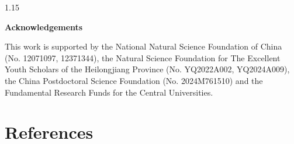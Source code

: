 \documentclass[preprint,12pt]{elsarticle1}
\numberwithin{equation}{section}
\begin{document}
\begin{spacing}{1.15}
\vspace{3mm}

\noindent
\textbf{Acknowledgements}
\vspace{3mm}
\noindent


This work is supported by the National Natural Science Foundation of China (No. 12071097, 12371344), the Natural Science Foundation for The Excellent Youth Scholars of the Heilongjiang Province (No. YQ2022A002, YQ2024A009), the China Postdoctoral Science Foundation (No. 2024M761510) and the Fundamental Research Funds for the Central Universities.









\section*{References}
%


\end{spacing}
\end{document}
